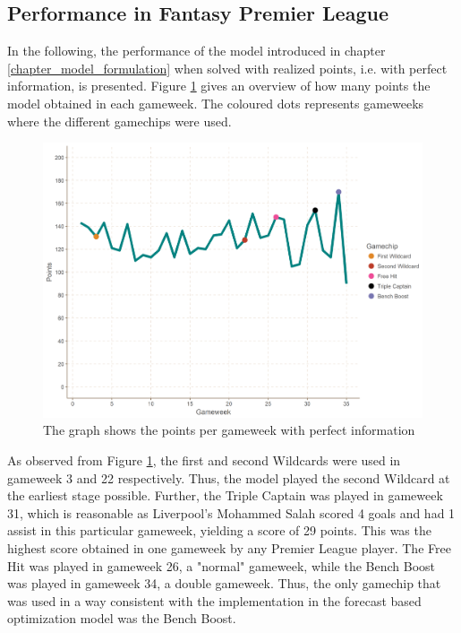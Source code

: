 \subsection{Performance in Fantasy Premier League}
In the following, the performance of the model introduced in chapter \ref{chapter_model_formulation} when solved with realized points, i.e. with perfect information, is presented. Figure \ref{Figure_Realized_points} gives an overview of how many points the model obtained in each gameweek. The coloured dots represents gameweeks where the different gamechips were used. 

\begin{figure}[H]
    \centering
    \includegraphics[scale=0.5]{fig/chapter_7/perf_gc.png}
    \caption{The graph shows the points per gameweek with perfect information}
\label{Figure_Realized_points}    
\end{figure}

As observed from Figure \ref{Figure_Realized_points}, the first and second Wildcards were used in gameweek 3 and 22 respectively. Thus, the model played the second Wildcard at the earliest stage possible. Further, the Triple Captain was played in gameweek 31, which is reasonable as Liverpool's Mohammed Salah scored 4 goals and had 1 assist in this particular gameweek, yielding a score of 29 points. This was the highest score obtained in one gameweek by any Premier League player. The Free Hit was played in gameweek 26, a "normal" gameweek, while the Bench Boost was played in gameweek 34, a double gameweek. Thus, the only gamechip that was used in a way consistent with the implementation in the forecast based optimization model was the Bench Boost. 

